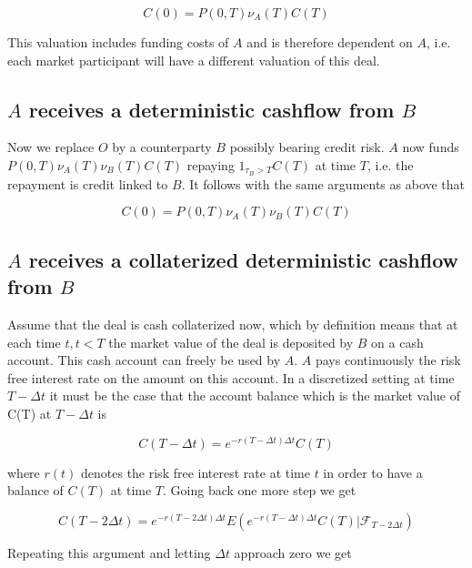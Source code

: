 \documentclass{article}%
\begin{document}
\begin{equation}
C(0) = P(0,T) \nu_A(T) C(T)
\end{equation}

This valuation includes funding costs of $A$ and is therefore dependent on $A$, i.e. each market participant will have a different valuation of this deal.

\subsection{$A$ receives a deterministic cashflow from $B$}

Now we replace $O$ by a counterparty $B$ possibly bearing credit risk. $A$ now funds $P(0,T) \nu_A(T) \nu_B(T) C(T)$ repaying $1_{\tau_B > T} C(T)$ at time $T$, i.e. the repayment is credit linked to $B$. It follows with the same arguments as above that

\begin{equation}
C(0) = P(0,T) \nu_A(T) \nu_B(T) C(T)
\end{equation}

\subsection{$A$ receives a collaterized deterministic cashflow from $B$}

Assume that the deal is cash collaterized now, which by definition means that at each time $t, t<T$ the market value of the deal is deposited by $B$ on a cash account. This cash account can freely be used by $A$. $A$ pays continuously the risk free interest rate on the amount on this account.  In a discretized setting
at time $T-\Delta t$ it must be the case that the account balance which is the market value of C(T) at $T-\Delta t$ is

\begin{equation}
C(T-\Delta t) = e^{-r(T-\Delta t)\Delta t}C(T)
\end{equation}

where $r(t)$ denotes the risk free interest rate at time $t$ in order to have a balance of $C(T)$ at time $T$. Going back one more step we get

\begin{equation}
C(T-2\Delta t) = e^{-r(T-2\Delta t)\Delta t} E( e^{-r(T-\Delta t)\Delta t}C(T) | \mathcal{F}_{T-2\Delta t} )
\end{equation}

Repeating this argument and letting $\Delta t$ approach zero we get
\end{document}
